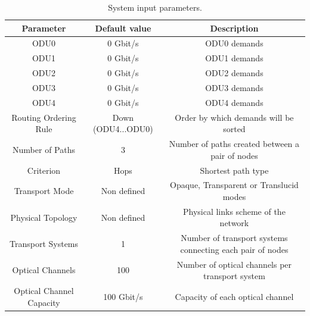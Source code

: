 \begin{table}[H]
	\centering
	\begin{tabular}{| c | c | c |}
		\hline
		\textbf{Parameter} & \textbf{Default value} & \textbf{Description} \\
		\hline
		ODU0 & 0 Gbit/s & ODU0 demands  \\ \hline
		ODU1 & 0 Gbit/s & ODU1 demands  \\ \hline
		ODU2 & 0 Gbit/s & ODU2 demands  \\ \hline
		ODU3 & 0 Gbit/s & ODU3 demands  \\ \hline
		ODU4 & 0 Gbit/s & ODU4 demands  \\ \hline
		Routing Ordering Rule & Down (ODU4...ODU0) & Order by which demands will be sorted  \\ \hline
		Number of Paths & 3 & Number of paths created between a pair of nodes  \\ \hline
		Criterion & Hops & Shortest path type \\ \hline
		Transport Mode & Non defined & Opaque, Transparent or Translucid modes	\\ \hline
		Physical Topology & Non defined & Physical links scheme of the network  \\ \hline
		Transport Systems & 1 & Number of transport systems connecting each pair of nodes  \\ \hline
		Optical Channels & 100 & Number of optical channels per transport system \\ \hline
		Optical Channel Capacity & 100 Gbit/s & Capacity of each optical channel \\ \hline
	\end{tabular}
	\caption{System input parameters.}
	\label{system_input}
\end{table}

